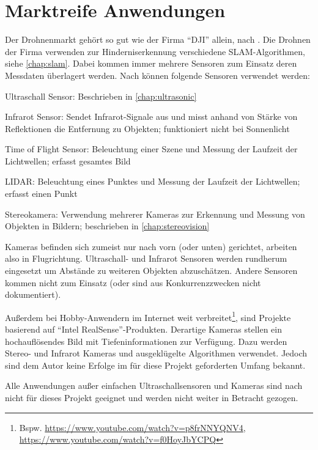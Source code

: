 \section{Marktreife Anwendungen}
Der Drohnenmarkt gehört so gut wie der Firma \enquote{DJI} allein, nach \cite{juergenoehlerStatistikDrohnenVerkaeufeNach}. Die Drohnen der Firma verwenden zur Hinderniserkennung verschiedene SLAM-Algorithmen\cite{ciobanuObstacleAvoidanceDJI2021}, siehe \cref{chap:slam}. Dabei kommen immer mehrere Sensoren zum Einsatz deren Messdaten überlagert werden. Nach \cite{ciobanuObstacleAvoidanceDJI2021} können folgende Sensoren verwendet werden:
\begin{compactdesc}
    \item[Ultraschall Sensor:] Beschrieben in \cref{chap:ultrasonic}
    \item[Infrarot Sensor:] Sendet Infrarot-Signale aus und misst anhand von Stärke von Reflektionen die Entfernung zu Objekten; funktioniert nicht bei Sonnenlicht
    \item[Time of Flight Sensor:] Beleuchtung einer Szene und Messung der Laufzeit der Lichtwellen; erfasst gesamtes Bild
    \item[LIDAR:] Beleuchtung eines Punktes und Messung der Laufzeit der Lichtwellen; erfasst einen Punkt
    \item[Stereokamera:] Verwendung mehrerer Kameras zur Erkennung und Messung von Objekten in Bildern; beschrieben in \cref{chap:stereovision} 
\end{compactdesc} 

Kameras befinden sich zumeist nur nach vorn (oder unten) gerichtet, arbeiten also in Flugrichtung. Ultraschall- und Infrarot Sensoren werden rundherum eingesetzt um Abstände zu weiteren Objekten abzuschätzen. Andere Sensoren kommen nicht zum Einsatz (oder sind aus Konkurrenzzwecken nicht dokumentiert). 

Außerdem bei Hobby-Anwendern im Internet weit verbreitet\footnote{Bspw. \url{https://www.youtube.com/watch?v=p8frNNYQNV4}, \url{https://www.youtube.com/watch?v=f0HoyJbYCPQ}}, sind Projekte basierend auf \enquote{Intel RealSense}-Produkten. Derartige Kameras stellen ein hochauflösendes Bild mit Tiefeninformationen zur Verfügung. Dazu werden Stereo- und Infrarot Kameras und ausgeklügelte Algorithmen verwendet. Jedoch sind dem Autor keine Erfolge im für diese Projekt geforderten Umfang bekannt.

Alle Anwendungen außer einfachen Ultraschallsensoren und Kameras sind nach \cite[Kapitel 4.3.8]{wirthErweiterungBestehendenDrohne2022} nicht für dieses Projekt geeignet und werden nicht weiter in Betracht gezogen.

